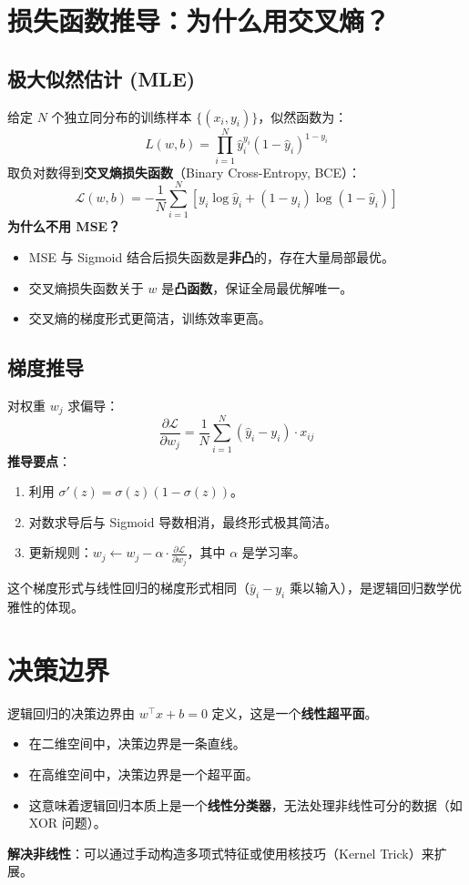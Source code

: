 \documentclass[12pt, a4paper]{article}
\begin{document}
\section{损失函数推导：为什么用交叉熵？}

\subsection{极大似然估计 (MLE)}
给定 $N$ 个独立同分布的训练样本 $\{(x_i, y_i)\}$，似然函数为：
$$ L(w, b) = \prod_{i=1}^N \hat{y}_i^{y_i} (1 - \hat{y}_i)^{1 - y_i} $$
取负对数得到\textbf{交叉熵损失函数}（Binary Cross-Entropy, BCE）：
$$ \mathcal{L}(w, b) = -\frac{1}{N} \sum_{i=1}^N \left[ y_i \log \hat{y}_i + (1 - y_i) \log(1 - \hat{y}_i) \right] $$
\textbf{为什么不用 MSE？}
\begin{itemize}
    \item MSE 与 Sigmoid 结合后损失函数是\textbf{非凸}的，存在大量局部最优。
    \item 交叉熵损失函数关于 $w$ 是\textbf{凸函数}，保证全局最优解唯一。
    \item 交叉熵的梯度形式更简洁，训练效率更高。
\end{itemize}

\subsection{梯度推导}
对权重 $w_j$ 求偏导：
$$ \frac{\partial \mathcal{L}}{\partial w_j} = \frac{1}{N} \sum_{i=1}^N (\hat{y}_i - y_i) \cdot x_{ij} $$
\textbf{推导要点}：
\begin{enumerate}
    \item 利用 $\sigma'(z) = \sigma(z)(1 - \sigma(z))$。
    \item 对数求导后与 Sigmoid 导数相消，最终形式极其简洁。
    \item 更新规则：$w_j \leftarrow w_j - \alpha \cdot \frac{\partial \mathcal{L}}{\partial w_j}$，其中 $\alpha$ 是学习率。
\end{enumerate}
这个梯度形式与线性回归的梯度形式相同（$\hat{y}_i - y_i$ 乘以输入），是逻辑回归数学优雅性的体现。

\section{决策边界}
逻辑回归的决策边界由 $w^\top x + b = 0$ 定义，这是一个\textbf{线性超平面}。
\begin{itemize}
    \item 在二维空间中，决策边界是一条直线。
    \item 在高维空间中，决策边界是一个超平面。
    \item 这意味着逻辑回归本质上是一个\textbf{线性分类器}，无法处理非线性可分的数据（如 XOR 问题）。
\end{itemize}
\textbf{解决非线性}：可以通过手动构造多项式特征或使用核技巧（Kernel Trick）来扩展。
\end{document}
